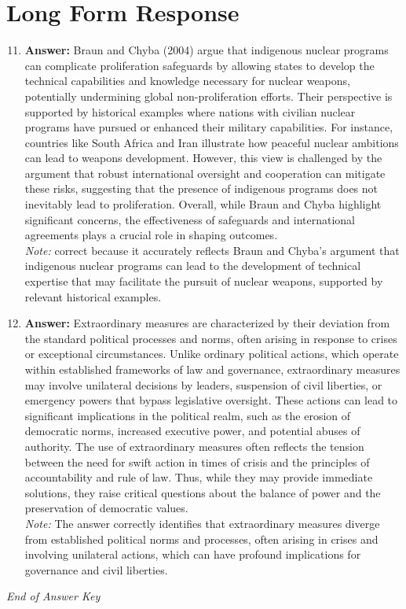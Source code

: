 \documentclass[12pt]{article}
\begin{document}
\section*{Long Form Response}
\begin{enumerate}[label=\arabic*.]
\setcounter{enumi}{10}
\item \textbf{Answer:} Braun and Chyba (2004) argue that indigenous nuclear programs can complicate proliferation safeguards by allowing states to develop the technical capabilities and knowledge necessary for nuclear weapons, potentially undermining global non-proliferation efforts. Their perspective is supported by historical examples where nations with civilian nuclear programs have pursued or enhanced their military capabilities. For instance, countries like South Africa and Iran illustrate how peaceful nuclear ambitions can lead to weapons development. However, this view is challenged by the argument that robust international oversight and cooperation can mitigate these risks, suggesting that the presence of indigenous programs does not inevitably lead to proliferation. Overall, while Braun and Chyba highlight significant concerns, the effectiveness of safeguards and international agreements plays a crucial role in shaping outcomes.
\\ \textit{Note:} correct because it accurately reflects Braun and Chyba's argument that indigenous nuclear programs can lead to the development of technical expertise that may facilitate the pursuit of nuclear weapons, supported by relevant historical examples.
\item \textbf{Answer:} Extraordinary measures are characterized by their deviation from the standard political processes and norms, often arising in response to crises or exceptional circumstances. Unlike ordinary political actions, which operate within established frameworks of law and governance, extraordinary measures may involve unilateral decisions by leaders, suspension of civil liberties, or emergency powers that bypass legislative oversight. These actions can lead to significant implications in the political realm, such as the erosion of democratic norms, increased executive power, and potential abuses of authority. The use of extraordinary measures often reflects the tension between the need for swift action in times of crisis and the principles of accountability and rule of law. Thus, while they may provide immediate solutions, they raise critical questions about the balance of power and the preservation of democratic values.
\\ \textit{Note:} The answer correctly identifies that extraordinary measures diverge from established political norms and processes, often arising in crises and involving unilateral actions, which can have profound implications for governance and civil liberties.
\end{enumerate}

\vfill
\noindent\textit{End of Answer Key}
\end{document}
